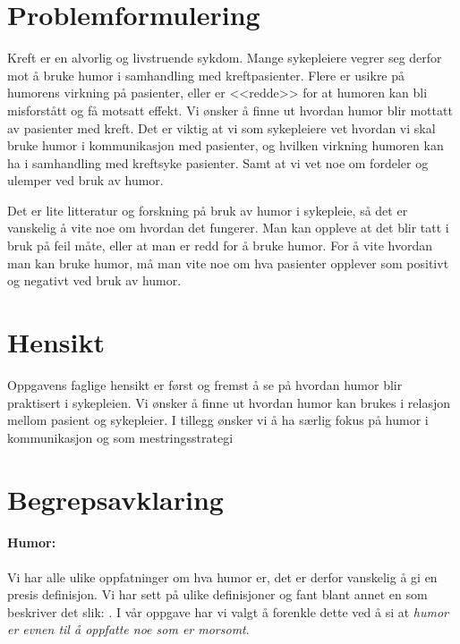 \section{Problemformulering}

Kreft er en alvorlig og livstruende sykdom. Mange sykepleiere vegrer seg derfor
mot å bruke humor i samhandling med kreftpasienter. Flere er usikre på humorens
virkning på pasienter, eller er <<redde>> for at humoren kan bli misforstått og
få motsatt effekt. Vi ønsker å finne ut hvordan humor blir mottatt av pasienter
med kreft. Det er viktig at vi som sykepleiere vet hvordan vi skal bruke humor
i kommunikasjon med pasienter, og hvilken virkning humoren kan ha i samhandling
med kreftsyke pasienter. Samt at vi vet noe om fordeler og ulemper ved bruk av
humor.

Det er lite litteratur og forskning på bruk av humor i sykepleie, så det er
vanskelig å vite noe om hvordan det fungerer. Man kan oppleve at det blir tatt
i bruk på feil måte, eller at man er redd for å bruke humor. For å vite hvordan
man kan bruke humor, må man vite noe om hva pasienter opplever som positivt og
negativt ved bruk av humor.

\section{Hensikt}

Oppgavens faglige hensikt er først og fremst å se på hvordan humor blir
praktisert i sykepleien. Vi ønsker å finne ut hvordan humor kan brukes i
relasjon mellom pasient og sykepleier. I tillegg ønsker vi å ha særlig fokus på
humor i kommunikasjon og som mestringsstrategi

\section{Begrepsavklaring}

\paragraph{Humor:} Vi har alle ulike oppfatninger om hva humor er, det er
derfor vanskelig å gi en presis definisjon. Vi har sett på ulike definisjoner
og fant blant annet en som beskriver det slik:
.  I vår oppgave
har vi valgt å forenkle dette ved å si at \textit{humor er evnen til å oppfatte
noe som er morsomt}.

